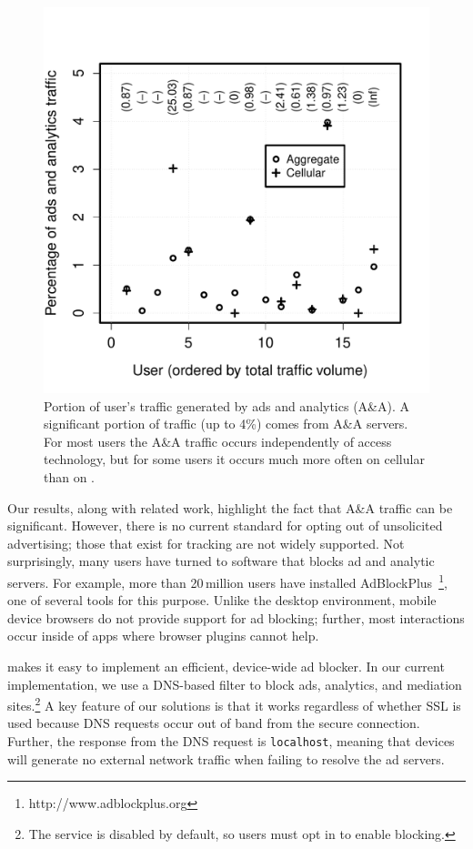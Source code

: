 \begin{figure}
\centering
        \includegraphics[width=\linewidth]{./plots/userAdsShare}
  \caption{Portion of user's traffic generated by ads and analytics (A\&A). A significant 
  portion of traffic (up to 4\%) comes from A\&A servers. For most users the A\&A 
  traffic occurs independently of access technology, but for some users it occurs 
  much more often on cellular than on \wifi. }
  \label{fig:adblocking}
\end{figure}


Our results, along with related work, highlight the fact that A\&A traffic can be 
significant. However, there is no current standard for opting 
out of unsolicited advertising; those that exist for tracking are not widely supported. 
Not surprisingly, many users have turned to software that blocks ad and analytic servers. 
For example, more than 20\,million users have installed 
AdBlockPlus~\footnote{http://www.adblockplus.org}, one of several tools for this purpose. 
Unlike the desktop environment, mobile device browsers do not provide support for 
ad blocking; further, most interactions occur inside of apps where browser plugins 
cannot help. 

\meddle makes it easy to implement an efficient, device-wide ad blocker. 
In our current implementation, we use a DNS-based filter to
block ads, analytics, and mediation sites.\footnote{The service is disabled by default, so users must 
opt in to enable blocking.} A key feature of our solutions is that it works 
regardless of whether SSL is used because DNS requests occur out of band 
from the secure connection. Further, the response from the DNS request is {\tt localhost}, 
meaning that devices will generate no external network traffic when failing 
to resolve the ad servers. 


